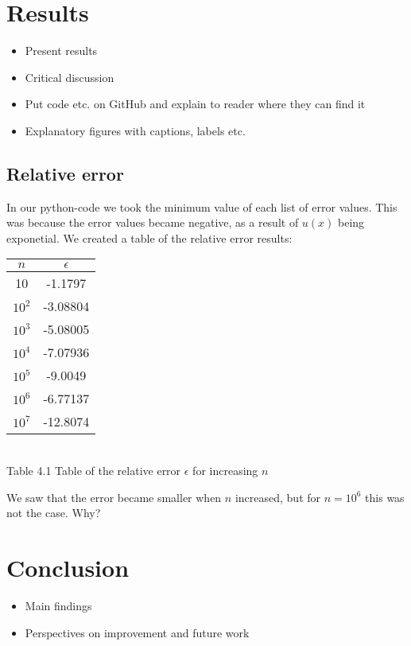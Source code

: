 \documentclass[12pt]{article}
\begin{document}
\section{Results}

\begin{itemize}
\item Present results
\item Critical discussion
\item Put code etc. on GitHub and explain to reader where they can find it
\item Explanatory figures with captions, labels etc.
\end{itemize}

\subsection{Relative error}
\noindent In our python-code we took the minimum value of each list of error values. This was because the error values became negative, as a result of $u(x)$ being exponetial. We created a table of the relative error results:

\begin{center}
\begin{tabular}{| c | c |}
	\hline
	$n$ & $\epsilon$ \\
	\hline
	10 & -1.1797 \\
	$10^2$ & -3.08804 \\
	$10^3$ & -5.08005 \\
	$10^4$ & -7.07936 \\
	$10^5$ & -9.0049 \\
	$10^6$ & -6.77137 \\
	$10^7$ & -12.8074\\
	\hline 
\end{tabular}
\medskip
\\
Table 4.1 Table of the relative error $\epsilon$ for increasing $n$
\end{center}

\noindent We saw that the error became smaller when $n$ increased, but for $n = 10^6$ this was not the case. Why?

\section{Conclusion}

\begin{itemize}
\item Main findings
\item Perspectives on improvement and future work
\end{itemize}
\end{document}
